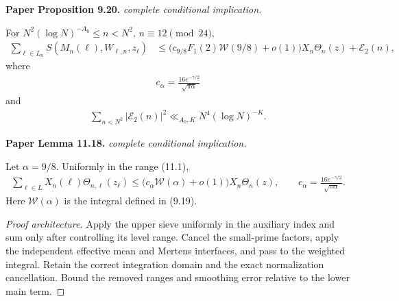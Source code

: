 \begin{lemma}
\label{upper_sieve}
\leanok
\par\medskip\noindent\textbf{Paper Proposition 9.20.} \textit{complete conditional implication.}\par
For $N^2(\log N)^{-A_0}\leq n<N^2$, $n\equiv12\pmod{24}$,
\begin{align}
 \sum_{\ell\in L_n}S(M_n(\ell),W_{\ell,n},z_\ell)
 &\leq
 \bigl(c_{9/8}F_1(2)\mathcal W(9/8)+o(1)\bigr)
 X_n\Theta_n(z)+\mathcal E_2(n),
\end{align}
where
\begin{align}
 c_\alpha=\frac{16e^{-\gamma/2}}{\sqrt{\pi\alpha}}
\end{align}
and
\begin{align}
\sum_{n<N^2}|\mathcal E_2(n)|^2
\ll_{A_0,K} N^4(\log N)^{-K}.
\end{align}
\par\medskip\noindent\textbf{Paper Lemma 11.18.} \textit{complete conditional implication.}\par
Let \(\alpha=9/8\).  Uniformly in the range \textup{(11.1)},
\begin{align}
 \sum_{\ell\in L}X_n(\ell)\Theta_{n,\ell}(z_\ell)
 \leq
 \bigl(c_\alpha\mathcal W(\alpha)+o(1)\bigr)
 X_n\Theta_n(z),
 \qquad
 c_\alpha=\frac{16e^{-\gamma/2}}{\sqrt{\pi\alpha}}.
\end{align}
Here \(\mathcal W(\alpha)\) is the integral defined in
\textup{(9.19)}.
\end{lemma}
\begin{proof}[Proof architecture]
\leanok
Apply the upper sieve uniformly in the auxiliary index and sum only after controlling its level range. Cancel the small-prime factors, apply the independent effective mean and Mertens interfaces, and pass to the weighted integral. Retain the correct integration domain and the exact normalization cancellation. Bound the removed ranges and smoothing error relative to the lower main term.
\end{proof}

